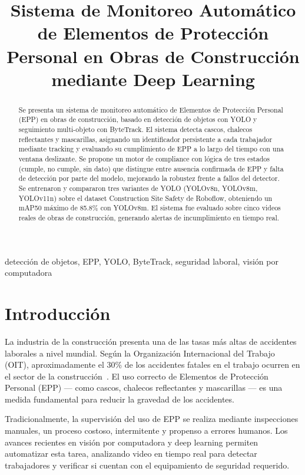 \documentclass[conference, 10pt]{IEEEtran}
\title{Sistema de Monitoreo Automático de Elementos de Protección Personal en Obras de Construcción mediante Deep Learning}
\author{
\IEEEauthorblockN{Bohórquez, María Gabriela. Ferrari, Maira Daniela. Pardo, Sebastián}
\IEEEauthorblockA{
Carrera de Especialización en Inteligencia Artificial (CEIA)\\
Facultad de Ingeniería, Universidad de Buenos Aires\\
\textit{Visión por Computadora II}
}
}
\begin{document}
\maketitle

\begin{abstract}
Se presenta un sistema de monitoreo automático de Elementos de Protección Personal (EPP) en obras de construcción, basado en detección de objetos con YOLO y seguimiento multi-objeto con ByteTrack. El sistema detecta cascos, chalecos reflectantes y mascarillas, asignando un identificador persistente a cada trabajador mediante tracking y evaluando su cumplimiento de EPP a lo largo del tiempo con una ventana deslizante. Se propone un motor de compliance con lógica de tres estados (cumple, no cumple, sin dato) que distingue entre ausencia confirmada de EPP y falta de detección por parte del modelo, mejorando la robustez frente a fallos del detector. Se entrenaron y compararon tres variantes de YOLO (YOLOv8n, YOLOv8m, YOLOv11n) sobre el dataset Construction Site Safety de Roboflow, obteniendo un mAP50 máximo de 85.8\% con YOLOv8m. El sistema fue evaluado sobre cinco videos reales de obras de construcción, generando alertas de incumplimiento en tiempo real.
\end{abstract}

\begin{IEEEkeywords}
detección de objetos, EPP, YOLO, ByteTrack, seguridad laboral, visión por computadora
\end{IEEEkeywords}

\section{Introducción}

La industria de la construcción presenta una de las tasas más altas de accidentes laborales a nivel mundial. Según la Organización Internacional del Trabajo (OIT), aproximadamente el 30\% de los accidentes fatales en el trabajo ocurren en el sector de la construcción~\cite{oit2023}. El uso correcto de Elementos de Protección Personal (EPP) --- como cascos, chalecos reflectantes y mascarillas --- es una medida fundamental para reducir la gravedad de los accidentes.

Tradicionalmente, la supervisión del uso de EPP se realiza mediante inspecciones manuales, un proceso costoso, intermitente y propenso a errores humanos. Los avances recientes en visión por computadora y deep learning permiten automatizar esta tarea, analizando video en tiempo real para detectar trabajadores y verificar si cuentan con el equipamiento de seguridad requerido.
\end{document}
